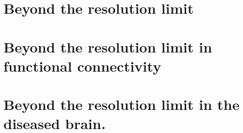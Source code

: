 \chapter{Beyond the resolution limit}\label{chap:beyondresolutionlimit}


\chapter{Beyond the resolution limit in functional connectivity}\label{chap:beyondresolutionlimitfunctionalconnectivity}


\chapter{Beyond the resolution limit in the diseased brain.}






% 
% 
%


